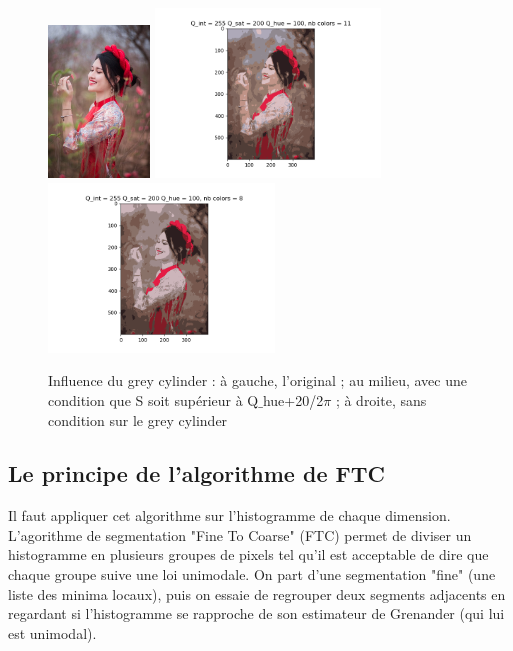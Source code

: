 \documentclass{article}
\begin{document}
\begin{figure}[h]
    \centering
    \includegraphics[width=2.7cm]{girl.jpeg}
    \includegraphics[width=6cm]{fig4_gauche.png}
    \includegraphics[width=6cm]{fig4_droite.png}
    \caption{Influence du grey cylinder : à gauche, l'original ; au milieu, avec une condition que S soit supérieur à Q$\_$hue+20/2$\pi$ ; à droite, sans condition sur le grey cylinder}
\end{figure}

\subsection{Le principe de l'algorithme de FTC}

Il faut appliquer cet algorithme sur l'histogramme de chaque dimension.\\ 

L'agorithme de segmentation "Fine To Coarse" (FTC) permet de diviser un histogramme en plusieurs groupes de pixels tel qu'il est acceptable de dire que chaque groupe suive une loi unimodale. On part d'une segmentation "fine" (une liste des minima locaux), puis on essaie de regrouper deux segments adjacents en regardant si l'histogramme se rapproche de son estimateur de Grenander (qui lui est unimodal).\\
\end{document}
